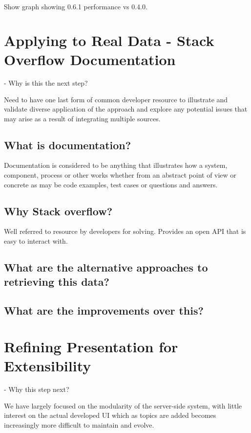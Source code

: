 Show graph showing 0.6.1 performance vs 0.4.0.

\section{Applying to Real Data - Stack Overflow Documentation}

- Why is this the next step?

Need to have one last form of common developer resource to illustrate and validate diverse application of the approach and explore any potential issues that may arise as a result of integrating multiple sources.

\subsection{What is documentation?}

Documentation is considered to be anything that illustrates how a system, component, process or other works whether from an abstract point of view or concrete as may be code examples, test cases or questions and answers.

\subsection{Why Stack overflow?}

Well referred to resource by developers for solving. Provides an open API that is easy to interact with.

\subsection{What are the alternative approaches to retrieving this data?}

\subsection{What are the improvements over this?}

\section{Refining Presentation for Extensibility}

- Why this step next?

We have largely focused on the modularity of the server-side system, with little interest on the actual developed UI which as topics are added becomes increasingly more difficult to maintain and evolve.


